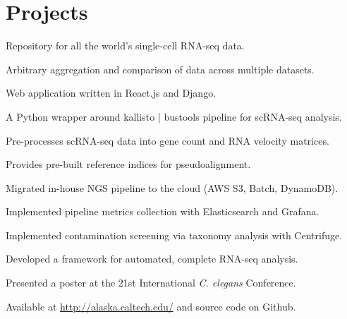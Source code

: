 \documentclass[]{resume}
\begin{document}
\begin{minipage}[t]{0.66\textwidth}


\section{Projects}
\vspace{\topsep} %
\begin{tightemize}
\item Repository for all the world's single-cell RNA-seq data.
\item Arbitrary aggregation and comparison of data across multiple datasets.
\item Web application written in React.js and Django.
\end{tightemize}
\sectionsep

\begin{tightemize}
\item A Python wrapper around kallisto | bustools pipeline for scRNA-seq analysis.
\item Pre-processes scRNA-seq data into gene count and RNA velocity matrices.
\item Provides pre-built reference indices for pseudoalignment.
\end{tightemize}
\sectionsep

\begin{tightemize}
\item Migrated in-house NGS pipeline to the cloud (AWS S3, Batch, DynamoDB).
\item Implemented pipeline metrics collection with Elasticsearch and Grafana.
\item Implemented contamination screening via taxonomy analysis with Centrifuge.
\end{tightemize}
\sectionsep

\begin{tightemize}
\item Developed a framework for automated, complete RNA-seq analysis.
\item Presented a poster at the 21st International \textit{C. elegans} Conference.
\item Available at \textcolor{blue}{ \href{http://alaska.caltech.edu/}{http://alaska.caltech.edu/}} and source code on Github.
\end{tightemize}
\sectionsep


\end{minipage}
\end{document}
